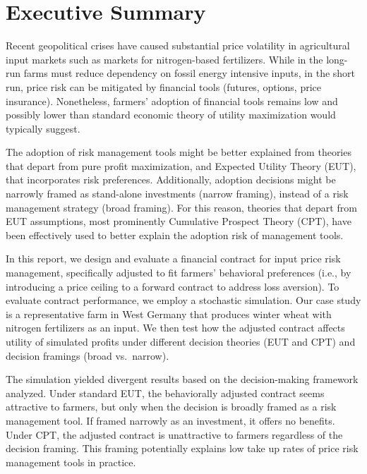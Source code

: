 \documentclass[12pt,a4paper]{article}
\begin{document}
\newpage

\section*{Executive Summary}

Recent geopolitical crises have caused substantial price volatility in agricultural input markets such as markets for nitrogen-based fertilizers. While in the long-run farms must reduce dependency on fossil energy intensive inputs, in the short run, price risk can be mitigated by financial tools (futures, options, price insurance). Nonetheless, farmers' adoption of financial tools remains low and possibly lower than standard economic theory of utility maximization would typically suggest.

The adoption of risk management tools might be better explained from theories that depart from pure profit maximization, and Expected Utility Theory (EUT), that incorporates risk preferences. Additionally, adoption decisions might be narrowly framed as stand-alone investments (narrow framing), instead of a risk management strategy (broad framing). For this reason, theories that depart from EUT assumptions, most prominently Cumulative Prospect Theory (CPT), have been effectively used to better explain the adoption risk of management tools.

In this report, we design and evaluate a financial contract for input price risk management, specifically adjusted to fit farmers' behavioral preferences (i.e., by introducing a price ceiling to a forward contract to address loss aversion). To evaluate contract performance, we employ a stochastic simulation. Our case study is a representative farm in West Germany that produces winter wheat with nitrogen fertilizers as an input. We then test how the adjusted contract affects utility of simulated profits under different decision theories (EUT and CPT) and decision framings (broad vs.\ narrow).

The simulation yielded divergent results based on the decision-making framework analyzed. Under standard EUT, the behaviorally adjusted contract seems attractive to farmers, but only when the decision is broadly framed as a risk management tool. If framed narrowly as an investment, it offers no benefits. Under CPT, the adjusted contract is unattractive to farmers regardless of the decision framing. This framing potentially explains low take up rates of price risk management tools in practice.
\end{document}
